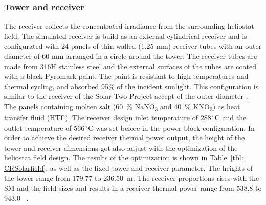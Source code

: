 \subsubsection{Tower and receiver}
The receiver collects the concentrated irradiance from the surrounding heliostat field. The simulated receiver is build as an external cylindrical receiver and is configurated with 24 panels of thin walled (1.25 mm) receiver tubes with an outer diameter of 60 mm arranged in a circle around the tower. The receiver tubes are made from 316H stainless steel and the external surfaces of the tubes are coated with a black Pyromark paint. The paint is resistant to high temperatures and thermal cycling, and absorbed 95\% of the incident sunlight. This configuration is similar to the receiver of the  Solar Two Project accept of the outer diameter \cite{Bradshaw2002}. The panels containing molten salt (60~\% NaNO\textsubscript{3} and 40~\% KNO\textsubscript{3}) as heat transfer fluid (HTF). The receiver design inlet temperature of 288$\,^{\circ}\mathrm{C}$ and the outlet temperature of 566$\,^{\circ}\mathrm{C}$ was set before in the power block configuration. In order to achieve the desired receiver thermal power output, the height of the tower and receiver dimensions got also adjust with the optimization of the heliostat field design. The results of the optimization is shown in Table~\ref{tbl: CRSolarfield}, as well as the fixed tower and receiver parameter. The heights of the tower range from 179.77 to \SI{236.50}{m}. The receiver proportions rises with the SM and the field sizes and results in a receiver thermal power range from 538.8 to 943.0 \si{\mega\wattth}.
